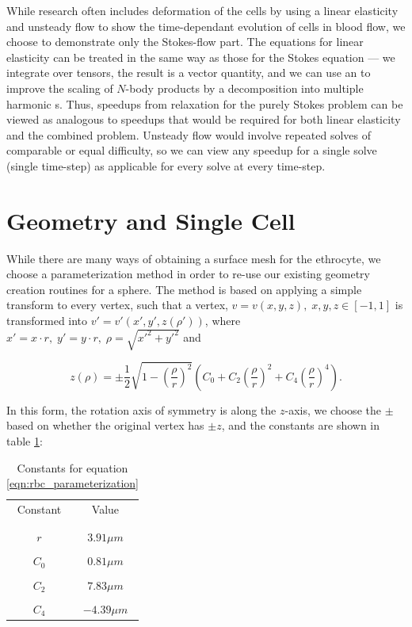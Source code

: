 While research often includes deformation of the cells by using a linear elasticity {\bem} and unsteady flow to show the time-dependant evolution of cells in blood flow, we choose to demonstrate only the Stokes-flow part. The equations for linear elasticity can be treated in the same way as those for the Stokes equation --- we integrate over tensors, the result is a vector quantity, and we can use an {\fmm} to improve the scaling of $N$-body products by a decomposition into multiple harmonic {\fmm}s. Thus, speedups from relaxation for the purely Stokes problem can be viewed as analogous to speedups that would be required for both linear elasticity and the combined problem. Unsteady flow would involve repeated {\bem} solves of comparable or equal difficulty, so we can view any speedup for a single solve (single time-step) as applicable for every solve at every time-step.

\section{Geometry and Single Cell}

While there are many ways of obtaining a surface mesh for the ethrocyte, we choose a parameterization method \cite{kruger2012} in order to re-use our existing geometry creation routines for a sphere. The method is based on applying a simple transform to every vertex, such that a vertex, $v = v(x,y,z),\;x,y,z\in [-1,1]$ is transformed into $v' = v'(x',y',z(\rho'))$, where $x' = x\cdot r,\; y' = y\cdot r,\; \rho = \sqrt{x'^{2}+y'^{2}}$ and

\begin{equation}
	\label{eqn:rbc_parameterization}
	z(\rho) = \pm \frac{1}{2}\sqrt{1 - \left(\frac{\rho}{r}\right)^{2}}\left ( C_0 + C_2 \left(\frac{\rho}{r}\right)^{2} + C_4\left(\frac{\rho}{r}\right)^{4}\right ).
\end{equation}

In this form, the rotation axis of symmetry is along the $z$-axis, we choose the $\pm$ based on whether the original vertex has $\pm z$, and the constants are shown in table \ref{tab:rbc_parameterization_constants}:

\begin{table}[htdp]
\begin{center}
\begin{tabular}{c|c}
	Constant & Value \\ 
	& \\\hline
	& \\
	$r$ & $3.91\mu m$ \\
	& \\
	$C_0$ & $0.81\mu m$ \\ 
	& \\
	$C_2$ & $7.83\mu m$ \\
	& \\
	$C_4$ & $-4.39\mu m$
\end{tabular}
\end{center}
\caption{Constants for equation \eqref{eqn:rbc_parameterization}}
\label{tab:rbc_parameterization_constants}
\end{table}%

